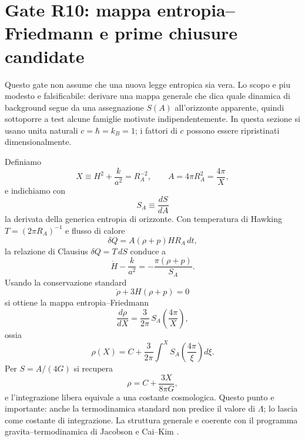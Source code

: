 \documentclass[11pt,a4paper]{article}
\begin{document}
\section{Gate R10: mappa entropia--Friedmann e prime chiusure candidate}
\label{sec:r10_entropy}

Questo gate non assume che una nuova legge entropica sia vera. Lo scopo e piu modesto e falsificabile: derivare una mappa generale che dica quale dinamica di background segue da una assegnazione $S(A)$ all'orizzonte apparente, quindi sottoporre a test alcune famiglie motivate indipendentemente. In questa sezione si usano unita naturali $c=\hbar=k_B=1$; i fattori di $c$ possono essere ripristinati dimensionalmente.

Definiamo
\begin{equation}
 X\equiv H^2+\frac{k}{a^2}=R_A^{-2},\qquad A=4\pi R_A^2=\frac{4\pi}{X},
\end{equation}
e indichiamo con
\begin{equation}
 S_A\equiv\frac{dS}{dA}
\end{equation}
la derivata della generica entropia di orizzonte. Con temperatura di Hawking $T=(2\pi R_A)^{-1}$ e flusso di calore
\begin{equation}
 \delta Q=A(\rho+p)H R_A\,dt,
\end{equation}
la relazione di Clausius $\delta Q=T\,dS$ conduce a
\begin{equation}
 \boxed{\dot H-\frac{k}{a^2}=-\frac{\pi(\rho+p)}{S_A}.}
 \label{eq:generic_entropy_raychaudhuri}
\end{equation}
Usando la conservazione standard
\begin{equation}
 \dot\rho+3H(\rho+p)=0
\end{equation}
si ottiene la mappa entropia--Friedmann
\begin{equation}
 \boxed{\frac{d\rho}{dX}=\frac{3}{2\pi}\,S_A\!\left(\frac{4\pi}{X}\right),}
 \label{eq:entropy_friedmann_map}
\end{equation}
ossia
\begin{equation}
 \boxed{\rho(X)=C+\frac{3}{2\pi}\int^X S_A\!\left(\frac{4\pi}{\xi}\right)d\xi.}
 \label{eq:entropy_friedmann_integral}
\end{equation}
Per $S=A/(4G)$ si recupera
\begin{equation}
 \rho=C+\frac{3X}{8\pi G},
\end{equation}
e l'integrazione libera equivale a una costante cosmologica. Questo punto e importante: anche la termodinamica standard non predice il valore di $\Lambda$; lo lascia come costante di integrazione. La struttura generale e coerente con il programma gravita--termodinamica di Jacobson e Cai--Kim \cite{Jacobson1995,CaiKim2005}.
\end{document}
